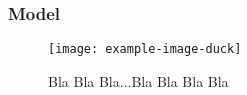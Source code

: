 \documentclass{beamer}
\begin{document}
\begin{frame}
\frametitle{Model}
\begin{figure}
    \texttt{[image: example-image-duck]}
    \caption{Bla Bla Bla...Bla Bla Bla Bla}
    \label{fig:dynamics}
\end{figure}

\end{frame}
\end{document}

